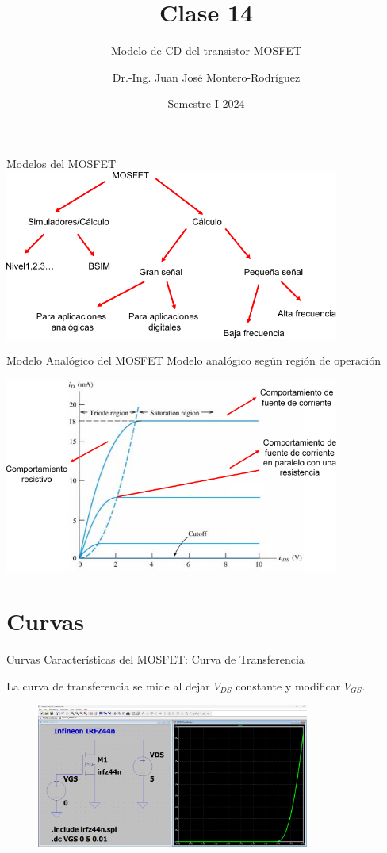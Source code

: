 \documentclass[t,aspectratio=169,10pt]{beamer}
\title{Clase 14}
\subtitle{Modelo de CD del transistor MOSFET}
\author[Dr.-Ing. Juan José Montero-Rodríguez]{Dr.-Ing. Juan José Montero-Rodríguez}
\institute{Escuela de Ingeniería Electrónica}
\date{Semestre I-2024}
\begin{document}
\begin{frame}
\titlepage
\end{frame}


\begin{frame}{Modelos del MOSFET}
\centering
\includegraphics[width=11cm]{modelosMOSFET}
\end{frame}


\begin{frame}{Modelo Analógico del MOSFET}
Modelo analógico según región de operación

\centering\vspace{3mm}
\includegraphics[width=11cm]{analogico1}
\end{frame}



\section{Curvas}
\begin{frame}{Curvas Características del MOSFET: Curva de Transferencia}

La curva de transferencia se mide al dejar $V_{DS}$ constante y modificar $V_{GS}$.

\begin{figure}
    \centering
    \includegraphics[width=0.8\textwidth]{figuras/mosfet_transfer.png}
\end{figure}



\end{frame}
\end{document}
